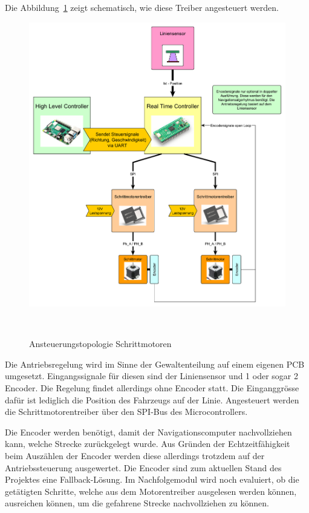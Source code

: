 \documentclass[main.tex]{subfiles} %
\begin{document}
Die Abbildung~\ref{Ansteuerungstopologie_Schrittmotorentreiber} zeigt
schematisch, wie diese Treiber angesteuert werden.

\begin{figure}[H]
    \centering
    \includegraphics[width = 1\linewidth]{fig_Antriebe_und_Dimensionierung/Konzept_RTC_Trinamic.pdf}
    \caption{Ansteuerungstopologie Schrittmotoren}~\label{Ansteuerungstopologie_Schrittmotorentreiber}
\end{figure}

Die Antriebsregelung wird im Sinne der Gewaltenteilung auf einem eigenen PCB
umgesetzt. Eingangssignale für diesen sind der Liniensensor und 1 oder sogar 2
Encoder. Die Regelung findet allerdings ohne Encoder statt. Die Einganggrösse
dafür ist lediglich die Position des Fahrzeugs auf der Linie. Angesteuert
werden die Schrittmotorentreiber über den SPI-Bus des Microcontrollers.

Die Encoder werden benötigt, damit der Navigationscomputer nachvollziehen kann,
welche Strecke zurückgelegt wurde. Aus Gründen der Echtzeitfähigkeit beim
Auszählen der Encoder werden diese allerdings trotzdem auf der
Antriebssteuerung ausgewertet. Die Encoder sind zum aktuellen Stand des
Projektes eine Fallback-Lösung. Im Nachfolgemodul wird noch evaluiert, ob die
getätigten Schritte, welche aus dem Motorentreiber ausgelesen werden können,
ausreichen können, um die gefahrene Strecke nachvollziehen zu können.
\end{document}

